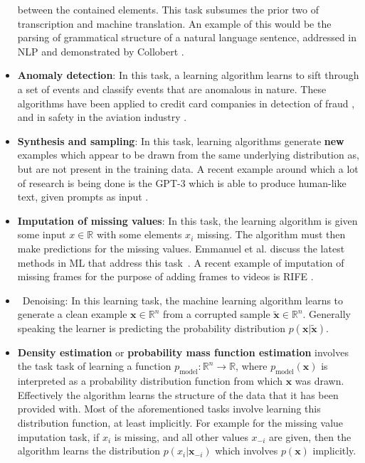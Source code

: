\begin{itemize}
    between the contained elements. This task subsumes the prior two of
    transcription and machine translation. An example of this would be the
    parsing of grammatical structure of a natural language sentence,
    addressed in \gls{NLP} and demonstrated by Collobert
    \cite{pmlr-v15-collobert11a}.
    \item \textbf{Anomaly detection}: In this task, a learning algorithm learns
    to sift through a set of events and classify events that are anomalous
    in nature. These algorithms have been applied to credit card companies
    in detection of fraud \cite{DBLP:journals/corr/abs-2108-10005}, and in
    safety in the aviation industry \cite{Janakiraman2016, Basora2019}.
    \item \textbf{Synthesis and sampling}: In this task, learning algorithms
    generate \textbf{new} examples which appear to be drawn from the same
    underlying distribution as, but are not present in the training data.
    A recent example around which a lot of research is being done is the
    \gls{GPT-3} which is able to produce human-like text, given prompts as
    input \cite{DBLP:journals/corr/abs-2005-14165}.
    \item \textbf{Imputation of missing values}: In this task, the learning
    algorithm is given some input $x\in\mathbb{R}$ with some elements
    $x_i$ missing. The algorithm must then make predictions for the
    missing values. Emmanuel et al. discuss the latest methods in
    \gls{ML} that address this task~\cite{Emmanuel2021}. A recent example of
    imputation of missing frames for the purpose of adding frames to videos
    is \gls{RIFE} \cite{huang2020rife}.
    \item \textb~{Denoising}: In this learning task, the machine learning
    algorithm learns to generate a clean example $\mathbf{x}\in\mathbb{R}^n$
    from a corrupted sample $\tilde{\mathbf{x}}\in\mathbb{R}^n$. Generally
    speaking the learner is predicting the probability distribution
    $p(\mathbf{x}|\tilde{\mathbf{x}})$.
    \item \textbf{Density estimation} or \textbf{probability mass function estimation}
    involves the task task of learning a function $p_\text{model}:\mathbb{R}^n\rightarrow{}\mathbb{R}$,
    where $p_\text{model}(\mathbf{x})$ is interpreted as a probability distribution function
    from which $\mathbf{x}$ was drawn. Effectively the algorithm learns the
    structure of the data that it has been provided with. Most of the
    aforementioned tasks involve learning this distribution function, at least
    implicitly. For example for the missing value imputation task, if $x_i$ is
    missing, and all other values $x_{-i}$ are given, then the algorithm learns
    the distribution $p(x_i|\mathbf{x}_{-i})$ which involves $p(\mathbf{x})$
    implicitly.
\end{itemize}
